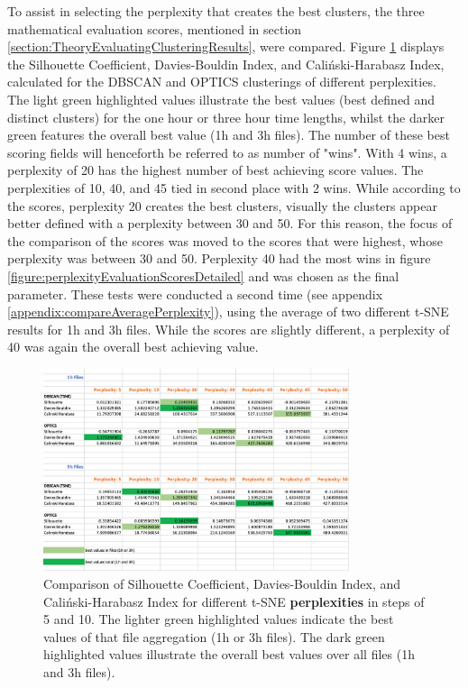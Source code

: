 To assist in selecting the perplexity that creates the best clusters, the three mathematical evaluation scores, mentioned in section \ref{section:TheoryEvaluatingClusteringResults}, were compared. Figure \ref{figure:perplexityEvaluationScores} displays the Silhouette Coefficient, Davies-Bouldin Index, and Caliński-Harabasz Index, calculated for the DBSCAN and OPTICS clusterings of different perplexities. The light green highlighted values illustrate the best values (best defined and distinct clusters) for the one hour or three hour time lengths, whilst the darker green features the overall best value (1h and 3h files). The number of these best scoring fields will henceforth be referred to as number of "wins". With 4 wins, a perplexity of 20 has the highest number of best achieving score values. The perplexities of 10, 40, and 45 tied in second place with 2 wins. While according to the scores, perplexity 20 creates the best clusters, visually the clusters appear better defined with a perplexity between 30 and 50.  For this reason, the focus of the comparison of the scores was moved to the scores that were highest, whose perplexity was between 30 and 50. Perplexity 40 had the most wins in figure \ref{figure:perplexityEvaluationScoresDetailed} and was chosen as the final parameter. These tests were conducted a second time (see appendix \ref{appendix:compareAveragePerplexity}), using the average of two different t-SNE results for 1h and 3h files. While the scores are slightly different, a perplexity of 40 was again the overall best achieving value.

\begin{figure}
  \centering
  \includegraphics[width=0.8\textwidth]{./images/tsneParametersTest/perplexity/perplexityEvaluationScores.png}
  \caption{Comparison of Silhouette Coefficient, Davies-Bouldin Index, and Caliński-Harabasz Index for different t-SNE \textbf{perplexities} in steps of 5 and 10. The lighter green highlighted values indicate the best values of that file aggregation (1h or 3h files). The dark green highlighted values illustrate the overall best values over all files (1h and 3h files).}
  \label{figure:perplexityEvaluationScores}
\end{figure}

